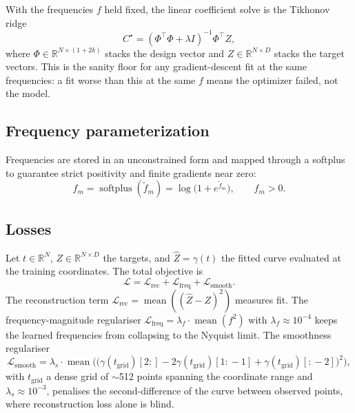 \documentclass[11pt,a4paper]{article}
\begin{document}
With the frequencies $f$ held fixed, the linear coefficient solve is the Tikhonov ridge
\begin{equation}
C^\star = (\Phi^\top \Phi + \lambda I)^{-1} \Phi^\top Z,
\label{eq:ridge}
\end{equation}
where $\Phi \in \mathbb{R}^{N \times (1+2k)}$ stacks the design vector and $Z \in \mathbb{R}^{N \times D}$ stacks the target vectors. This is the sanity floor for any gradient-descent fit at the same frequencies: a fit worse than this at the same $f$ means the optimizer failed, not the model.

\subsection{Frequency parameterization}

Frequencies are stored in an unconstrained form and mapped through a softplus to guarantee strict positivity and finite gradients near zero:
\begin{equation}
f_m = \operatorname{softplus}(\tilde f_m) = \log\!\big(1 + e^{\tilde f_m}\big), \qquad f_m > 0.
\label{eq:softplus}
\end{equation}

\subsection{Losses}

Let $t \in \mathbb{R}^N$, $Z \in \mathbb{R}^{N \times D}$ the targets, and $\hat Z = \gamma(t)$ the fitted curve evaluated at the training coordinates. The total objective is
\begin{equation}
\mathcal{L} = \mathcal{L}_{\mathrm{rec}} + \mathcal{L}_{\mathrm{freq}} + \mathcal{L}_{\mathrm{smooth}}.
\label{eq:totalloss}
\end{equation}
The reconstruction term $\mathcal{L}_{\mathrm{rec}} = \operatorname{mean}((\hat Z - Z)^2)$ measures fit. The frequency-magnitude regulariser $\mathcal{L}_{\mathrm{freq}} = \lambda_f \cdot \operatorname{mean}(f^2)$ with $\lambda_f \approx 10^{-4}$ keeps the learned frequencies from collapsing to the Nyquist limit. The smoothness regulariser
\begin{equation}
\mathcal{L}_{\mathrm{smooth}} = \lambda_s \cdot \operatorname{mean}\Big( \big(\gamma(t_{\mathrm{grid}})[2:] - 2\gamma(t_{\mathrm{grid}})[1{:}\!-\!1] + \gamma(t_{\mathrm{grid}})[:\!-\!2]\big)^2 \Big),
\label{eq:lsmooth}
\end{equation}
with $t_{\mathrm{grid}}$ a dense grid of $\sim$512 points spanning the coordinate range and $\lambda_s \approx 10^{-3}$, penalises the second-difference of the curve between observed points, where reconstruction loss alone is blind.
\end{document}
